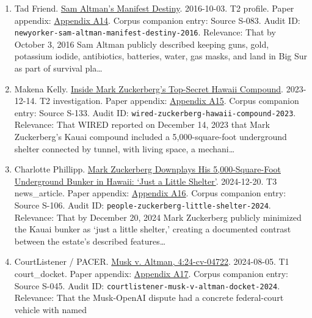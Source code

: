 \documentclass[
  american,
  11pt,
  letterpaper,
]{article}
\begin{document}
\begin{enumerate}
  2026, the AI legitimacy field had expanded into a formal Vatican
  encyclical rather than remaining confined to industry, policy, or
  technical discourse.
\item
  Tad Friend.
  \href{https://www.newyorker.com/magazine/2016/10/10/sam-altmans-manifest-destiny}{Sam
  Altman's Manifest Destiny}. 2016-10-03. T2 profile. Paper appendix:
  \hyperref[appendix-a14-sam-altman-s-manifest-destiny]{Appendix A14}.
  Corpus companion entry: Source S-083. Audit ID:
  \texttt{newyorker-sam-altman-manifest-destiny-2016}. Relevance: That
  by October 3, 2016 Sam Altman publicly described keeping guns, gold,
  potassium iodide, antibiotics, batteries, water, gas masks, and land
  in Big Sur as part of survival pla\ldots{}
\item
  Makena Kelly.
  \href{https://www.wired.com/story/mark-zuckerberg-inside-hawaii-compound}{Inside
  Mark Zuckerberg's Top-Secret Hawaii Compound}. 2023-12-14. T2
  investigation. Paper appendix:
  \hyperref[appendix-a15-inside-mark-zuckerbergs-top-secret-hawaii-compound]{Appendix
  A15}. Corpus companion entry: Source S-133. Audit ID:
  \texttt{wired-zuckerberg-hawaii-compound-2023}. Relevance: That WIRED
  reported on December 14, 2023 that Mark Zuckerberg's Kauai compound
  included a 5,000-square-foot underground shelter connected by tunnel,
  with living space, a mechani\ldots{}
\item
  Charlotte Phillipp.
  \href{https://people.com/mark-zuckerberg-hawaii-bunker-5000-square-feet-8765376}{Mark
  Zuckerberg Downplays His 5,000-Square-Foot Underground Bunker in
  Hawaii: `Just a Little Shelter'}. 2024-12-20. T3 news\_article. Paper
  appendix:
  \hyperref[appendix-a16-mark-zuckerberg-downplays-his-5-000-square-foot-underground-bunker-in-hawaii-just-a-little-shelter]{Appendix
  A16}. Corpus companion entry: Source S-106. Audit ID:
  \texttt{people-zuckerberg-little-shelter-2024}. Relevance: That by
  December 20, 2024 Mark Zuckerberg publicly minimized the Kauai bunker
  as `just a little shelter,' creating a documented contrast between the
  estate's described features\ldots{}
\item
  CourtListener / PACER.
  \href{https://www.courtlistener.com/docket/69013420/musk-v-altman/}{Musk
  v. Altman, 4:24-cv-04722}. 2024-08-05. T1 court\_docket. Paper
  appendix: \hyperref[appendix-a17-musk-v-altman-4-24-cv-04722]{Appendix
  A17}. Corpus companion entry: Source S-045. Audit ID:
  \texttt{courtlistener-musk-v-altman-docket-2024}. Relevance: That the
  Musk-OpenAI dispute had a concrete federal-court vehicle with named

\end{enumerate}
\end{document}
